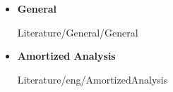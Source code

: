 \begin{frame}{\LectureFurtherLiterature}
  \begin{itemize}
    \item
      \textbf{General}
      \begin{btSect}{Literature/General/General}
        \btPrintAll
      \end{btSect}
  \end{itemize}
\end{frame}


\begin{frame}{\LectureFurtherLiterature}
  \begin{itemize}
    \item
      \textbf{Amortized Analysis}
      \begin{btSect}{Literature/eng/AmortizedAnalysis}
        \btPrintAll
      \end{btSect}
  \end{itemize}
\end{frame}